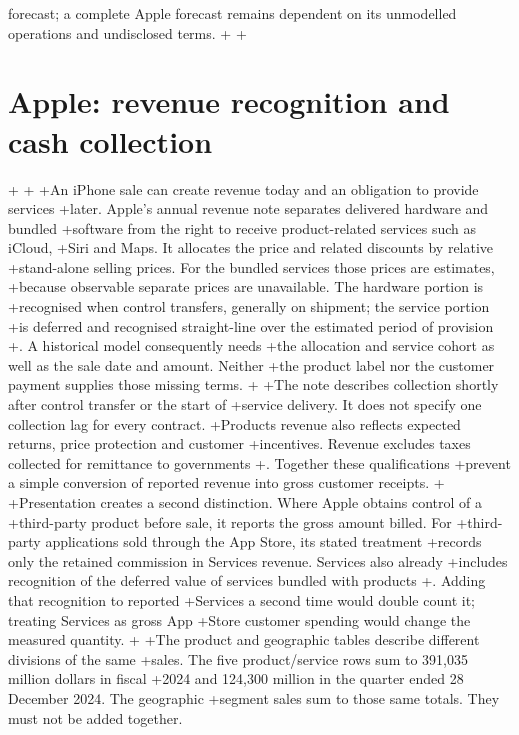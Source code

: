  forecast; a complete Apple forecast remains dependent on its unmodelled
 operations and undisclosed terms.
+
+\section{Apple: revenue recognition and cash collection}
+\label{sec:apple-revenue}
+
+An iPhone sale can create revenue today and an obligation to provide services
+later. Apple's annual revenue note separates delivered hardware and bundled
+software from the right to receive product-related services such as iCloud,
+Siri and Maps. It allocates the price and related discounts by relative
+stand-alone selling prices. For the bundled services those prices are estimates,
+because observable separate prices are unavailable. The hardware portion is
+recognised when control transfers, generally on shipment; the service portion
+is deferred and recognised straight-line over the estimated period of provision
+\citep[Note 2, printed p.~35]{apple2024}. A historical model consequently needs
+the allocation and service cohort as well as the sale date and amount. Neither
+the product label nor the customer payment supplies those missing terms.
+
+The note describes collection shortly after control transfer or the start of
+service delivery. It does not specify one collection lag for every contract.
+Products revenue also reflects expected returns, price protection and customer
+incentives. Revenue excludes taxes collected for remittance to governments
+\citep[Notes 1--2, printed pp.~34--35]{apple2024}. Together these qualifications
+prevent a simple conversion of reported revenue into gross customer receipts.
+
+Presentation creates a second distinction. Where Apple obtains control of a
+third-party product before sale, it reports the gross amount billed. For
+third-party applications sold through the App Store, its stated treatment
+records only the retained commission in Services revenue. Services also already
+includes recognition of the deferred value of services bundled with products
+\citep[Note 2, printed p.~35]{apple2024}. Adding that recognition to reported
+Services a second time would double count it; treating Services as gross App
+Store customer spending would change the measured quantity.
+
+The product and geographic tables describe different divisions of the same
+sales. The five product/service rows sum to 391,035 million dollars in fiscal
+2024 and 124,300 million in the quarter ended 28 December 2024. The geographic
+segment sales sum to those same totals. They must not be added together.
